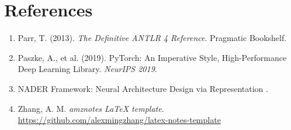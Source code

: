 \documentclass{nngraph-en}
\begin{document}
\chapter*{References}

\begin{enumerate}
    \item Parr, T. (2013). \textit{The Definitive ANTLR 4 Reference}.
    Pragmatic Bookshelf.
    \item Paszke, A., et al. (2019). PyTorch: An Imperative Style,
    High-Performance Deep Learning Library. \textit{NeurIPS 2019}.
    \item NADER Framework: Neural Architecture Design via
    Representation .
    \item Zhang, A. M. \textit{amznotes LaTeX template}.
    \url{https://github.com/alexmingzhang/latex-notes-template}
\end{enumerate}
\end{document}
